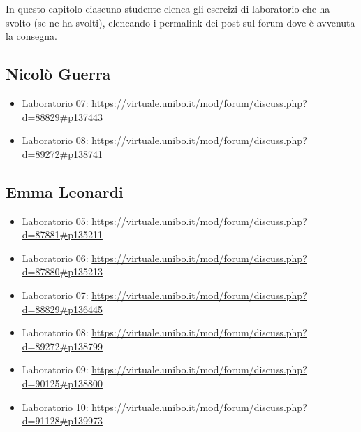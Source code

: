 \documentclass[a4paper,12pt]{report}
\begin{document}
In questo capitolo ciascuno studente elenca gli esercizi di laboratorio che ha svolto
(se ne ha svolti),
elencando i permalink dei post sul forum dove è avvenuta la consegna.

\subsection{Nicolò Guerra}
\begin{itemize}
	\item Laboratorio 07: \url{https://virtuale.unibo.it/mod/forum/discuss.php?d=88829#p137443}
	\item Laboratorio 08: \url{https://virtuale.unibo.it/mod/forum/discuss.php?d=89272#p138741}
\end{itemize}

\subsection{Emma Leonardi}
\begin{itemize}
	\item Laboratorio 05: \url{https://virtuale.unibo.it/mod/forum/discuss.php?d=87881#p135211}
	\item Laboratorio 06: \url{https://virtuale.unibo.it/mod/forum/discuss.php?d=87880#p135213}
	\item Laboratorio 07: \url{https://virtuale.unibo.it/mod/forum/discuss.php?d=88829#p136445}
	\item Laboratorio 08: \url{https://virtuale.unibo.it/mod/forum/discuss.php?d=89272#p138799}
	\item Laboratorio 09: \url{https://virtuale.unibo.it/mod/forum/discuss.php?d=90125#p138800}
	\item Laboratorio 10: \url{https://virtuale.unibo.it/mod/forum/discuss.php?d=91128#p139973}
\end{itemize}



\end{document}
